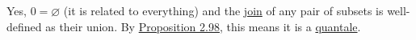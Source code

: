 Yes, $0=\varnothing$ (it is related to everything) and the \hyperref[D1.81]{join} of any pair of subsets is well-defined as their union.  By \hyperref[P2.98]{Proposition 2.98}, this means it is a \hyperref[D2.90]{quantale}.
